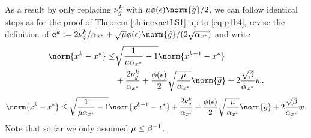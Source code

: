 As a result by only replacing $\nu_g^k$ with $\mu\phi(\epsilon)\norm{\g}/2$, we can follow identical steps as for the proof of Theorem \ref{th:inexactLS1} up to \eqref{eq:p1b4}, revise the definition of $\nut^k:={2\nug^k}/{\mmx} + {\sqrt{\mu}\phi(\epsilon)\norm{\g}}/(2\sqrt{{\mmx}})$ and write
\ifCLASSOPTIONtwocolumn
\begin{align*}
\norm{x^k-x^\gt}\leq& \sqrt{\frac{1}{\mu\mmx}-1} \norm{x^{k-1}-x^\gt} \\
&+ \frac{2\nug^k}{\mmx} +\frac{\phi(\epsilon)}{2} \sqrt{\frac{\mu}{\mmx}}\norm{\g} + 2\frac{\sqrt{\MM}}{\mmx}w. 
\end{align*}
\else
\begin{align*}
\norm{x^k-x^\gt}\leq \sqrt{\frac{1}{\mu\mmx}-1} \norm{x^{k-1}-x^\gt} 
+ \frac{2\nug^k}{\mmx} +\frac{\phi(\epsilon)}{2} \sqrt{\frac{\mu}{\mmx}}\norm{\g} + 2\frac{\sqrt{\MM}}{\mmx}w. 
\end{align*}
\fi
Note that so far we only assumed $\mu\leq \beta^{-1}$. 

